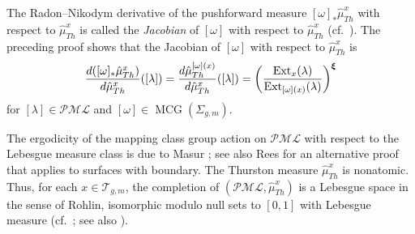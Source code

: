 \documentclass[dvipdfmx]{amsart}
\theoremstyle{remark}
\newcommand{\ext}{{\rm Ext}}
\newcommand{\teich}{\mathcal{T}}
\newcommand{\mcg}{\operatorname{MCG}}
\newcommand{\PThursM}{\hat{\mu}_{Th}}
\newcommand{\convgenus}{{\boldsymbol \xi}}
\newcommand{\pml}{\mathcal{PML}}
\begin{document}
The Radon--Nikodym derivative of the pushforward measure $[\omega]_*\PThursM^x$ with respect to $\PThursM^x$ is called the \emph{Jacobian} of $[\omega]$ with respect to $\PThursM^x$ (cf.\ \cite[Appendix D11]{HubbardVol3_2022}).
The preceding proof shows that the Jacobian of $[\omega]$ with respect to $\PThursM^x$ is
\begin{equation}
\label{eq:Radon-Nikodym2}
\dfrac{d([\omega]_*\PThursM^x)}{d\PThursM^x}([\lambda])=
\dfrac{d\PThursM^{[\omega](x)}}{d\PThursM^x}([\lambda])=
\left(\frac{\ext_x(\lambda)}{\ext_{[\omega](x)}(\lambda)}\right)^{\convgenus}
\end{equation}
for $[\lambda]\in \pml$ and $[\omega]\in \mcg(\Sigma_{g,m})$.

The ergodicity of the mapping class group action on $\pml$ with respect to the Lebesgue measure class is due to Masur \cite{Masur1982}; see also Rees \cite{Rees1981} for an alternative proof that applies to surfaces with boundary.
The Thurston measure $\PThursM^x$ is nonatomic. Thus, for each $x\in\teich_{g,m}$, the completion of $(\pml,\PThursM^x)$ is a Lebesgue space in the sense of Rohlin, isomorphic modulo null sets to $[0,1]$ with Lebesgue measure (cf.\ \cite{Rohlin1952}; see also \cite[Theorem 17.41]{Kechris1995}).
\end{document}
